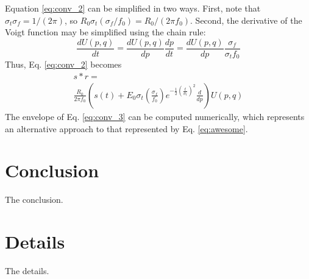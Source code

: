 \documentclass[amsmath,amssymb,aps,prd,10pt,twocolumn,showkeys]{revtex4}
\begin{document}
\begin{itemize}
Equation \ref{eq:conv_2} can be simplified in two ways.  First, note that $\sigma_t \sigma_f = 1/(2\pi)$, so $R_0\sigma_t (\sigma_f/f_0) = R_0/(2\pi f_0)$.  Second, the derivative of the Voigt function may be simplified using the chain rule:
\begin{equation}
\frac{dU(p,q)}{dt} = \frac{dU(p,q)}{dp}\frac{dp}{dt} = \frac{dU(p,q)}{dp} \frac{\sigma_f}{\sigma_t f_0}
\end{equation}
Thus, Eq. \ref{eq:conv_2} becomes
\begin{multline}
s * r = \\
\frac{R_0}{2\pi f_0}\left(s(t) + E_0 \sigma_t \left(\frac{\sigma_f}{f_0}\right) e^{-\frac{1}{2}\left(\frac{t}{\sigma_t}\right)^2} \frac{d}{dp}\right)U(p,q) \label{eq:conv_3}
\end{multline}
The envelope of Eq. \ref{eq:conv_3} can be computed numerically, which represents an alternative approach to that represented by Eq. \ref{eq:awesome}.
\end{itemize}

\section{Conclusion}
\label{sec:conc}

The conclusion.

\appendix

\section{Details}
\label{app:a}

The details.


\end{document}
